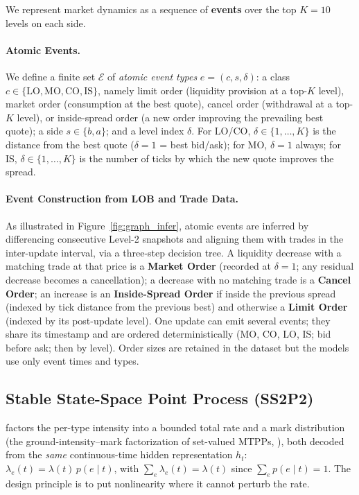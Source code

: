 We represent market dynamics as a sequence of \textbf{events} over the top
$K=10$ levels on each side.

\paragraph{Atomic Events.}
We define a finite set $\mathcal{E}$ of \emph{atomic event types}
$e=(c,s,\delta)$: a class $c\in\{\text{LO},\text{MO},\text{CO},\text{IS}\}$,
namely limit order (liquidity provision at a top-$K$ level), market order
(consumption at the best quote), cancel order (withdrawal at a top-$K$
level), or inside-spread order (a new order improving the prevailing best
quote); a side $s\in\{b,a\}$; and a level index $\delta$. For LO/CO,
$\delta\in\{1,\dots,K\}$ is the distance from the best quote ($\delta=1$ =
best bid/ask); for MO, $\delta=1$ always; for IS, $\delta\in\{1,\dots,K\}$
is the number of ticks by which the new quote improves the spread.

\paragraph{Event Construction from LOB and Trade Data.}
As illustrated in Figure~\ref{fig:graph_infer}, atomic events are inferred
by differencing consecutive Level-2 snapshots and aligning them with trades
in the inter-update interval, via a three-step decision tree. A liquidity
decrease with a matching trade at that price is a \textbf{Market Order}
(recorded at $\delta=1$; any residual decrease becomes a cancellation); a
decrease with no matching trade is a \textbf{Cancel Order}; an increase is
an \textbf{Inside-Spread Order} if inside the previous spread (indexed by
tick distance from the previous best) and otherwise a \textbf{Limit Order}
(indexed by its post-update level). One update can emit several events; they
share its timestamp and are ordered deterministically (MO, CO, LO, IS; bid
before ask; then by level). Order sizes are retained in the dataset but the
models use only event times and types.


\subsection{Stable State-Space Point Process (SS2P2)}
\ssppp{} factors the per-type intensity into a bounded total rate and a
mark distribution (the ground-intensity--mark factorization of set-valued
MTPPs, \citealp{chang2024probabilistic}), both decoded from the \emph{same}
continuous-time hidden representation $h_t$:
$\lambda_e(t)=\lambda(t)\,p(e\mid t)$, with
$\sum_{e}\lambda_e(t)=\lambda(t)$ since $\sum_{e} p(e\mid t)=1$. The design
principle is to put nonlinearity where it cannot perturb the rate.



